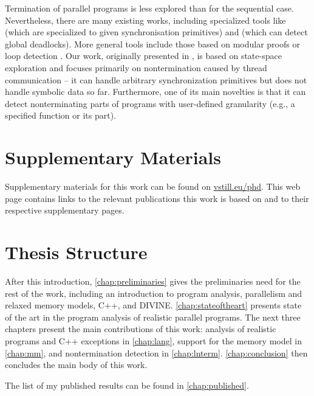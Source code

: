 Termination of parallel programs is less explored than for the sequential case.
Nevertheless, there are many existing works, including specialized tools like  (which are specialized to given synchronisation primitives) and  (which can detect global deadlocks).
More general tools include those based on modular proofs  or loop detection .
Our work, originally presented in , is based on state-space exploration and focuses primarily on nontermination caused by thread communication -- it can handle arbitrary synchronization primitives but does not handle symbolic data so far.
Furthermore, one of its main novelties is that it can detect nonterminating parts of programs with user-defined granularity (e.g., a specified function or its part).

\section{Supplementary Materials}

Supplementary materials for this work can be found on \href{http://vstill.eu/phd}{vstill.eu/phd}.
This web page contains links to the relevant publications this work is based on and to their respective supplementary pages.


\section{Thesis Structure}

After this introduction, \autoref{chap:preliminaries} gives the preliminaries
need for the rest of the work, including an introduction to program analysis, parallelism and relaxed memory models, C++, and DIVINE.
\autoref{chap:stateoftheart} presents state of the art in the program analysis
of realistic parallel programs.
The next three chapters present the main contributions of this work: analysis of
realistic programs and C++ exceptions in \autoref{chap:lang}, support for the
\xtso memory model in \autoref{chap:mm}, and nontermination detection in
\autoref{chap:lnterm}.
\autoref{chap:conclusion} then concludes the main body of this work.

The list of my published results can be found in \autoref{chap:published}.

